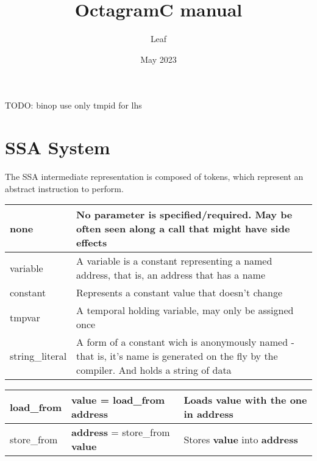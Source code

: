\documentclass[12pt, letterpaper]{article}
\title{OctagramC manual}
\author{Leaf}
\date{May 2023}
\begin{document}
\maketitle
\newpage
%
TODO: binop use only tmpid for lhs
%
\newpage
\section{SSA System}
%
The SSA intermediate representation is composed of tokens, which represent an
abstract instruction to perform.
%
\newpage
\begin{center}
\begin{table}
\begin{tabularx}{\columnwidth}{|X|X|}
    \hline
    none & No parameter is specified/required. May be often seen along a call that might have side effects \\
    \hline
    variable & A variable is a constant representing a named address, that is, an address that has a name \\
    \hline
    constant & Represents a constant value that doesn't change \\
    \hline
    tmpvar & A temporal holding variable, may only be assigned once \\
    \hline
    string\_literal & A form of a constant wich is anonymously named - that is, it's name is generated on the fly by the compiler. And holds a string of data \\
    \hline
\end{tabularx}
\label{table: SSA Variable Parameters}
\end{table}
\end{center}
%
\begin{center}
\begin{table}
\begin{tabularx}{\columnwidth}{|X|X|X|}
    \hline
    load\_from & \textbf{value} = load\_from \textbf{address} & Loads \textbf{value} with the one in \textbf{address} \\ 
    \hline
    store\_from & \textbf{address} = store\_from \textbf{value} & Stores \textbf{value} into \textbf{address} \\ 
    \hline
\end{tabularx}
\label{table: SSA Instructions}
\end{table}
\end{center}
%
\newpage
\end{document}

